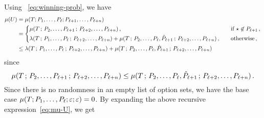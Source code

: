     Using ~\eqref{eq:winning-prob}, we have 
    \begin{align}
        \mu(U)
        &= \mu(T; P_1, \ldots, P_\ell; P_{\ell+1}, \ldots, P_{\ell+n}) \nonumber \\
        &= \begin{dcases}
            \mu(T\,;\,P_2, \ldots, P_{\ell+1} \,;\, P_{\ell+{2}}, \ldots, P_{\ell + n})\,,
                &\quad\text{if $\star \not \in P_{\ell + 1}$}\,,
                \\
            \lambda(T\,;\,P_{1}, \ldots, P_{\ell}\,;\, P_{\ell+{2}}, \ldots, P_{\ell + n}) 
            + \mu(T\,;\,P_{2}, \ldots, P_{\ell}, \hat{P}_{\ell + 1} \,;\, P_{\ell+{2}}, \ldots, P_{\ell + n})\,,
                &\quad\text{otherwise}
            \,,
        \end{dcases} \nonumber \\
        &\leq 
            \lambda(T\,;\,P_{1}, \ldots, P_{\ell}\,;\, P_{\ell+{2}}, \ldots, P_{\ell + n}) 
            + \mu(T\,;\,P_{2}, \ldots, P_{\ell}, \hat{P}_{\ell + 1} \,;\, P_{\ell+{2}}, \ldots, P_{\ell + n})
            \label{eq:mu-U}
    \end{align}
    since $$
    \mu(T\,;\,P_2, \ldots, P_{\ell+1} \,;\, P_{\ell+{2}}, \ldots, P_{\ell + n}) 
    \leq 
    \mu(T\,;\,P_{2}, \ldots, P_{\ell}, \hat{P}_{\ell + 1} \,;\, P_{\ell+{2}}, \ldots, P_{\ell + n})
    \,.
    $$
    Since there is no randomness in an empty list of option sets, 
    we have the base case 
    $\mu(T; P_1, \ldots, P_\ell; \varepsilon; \varepsilon) = 0$.
    By expanding the above recursive expression~\eqref{eq:mu-U}, we get 
